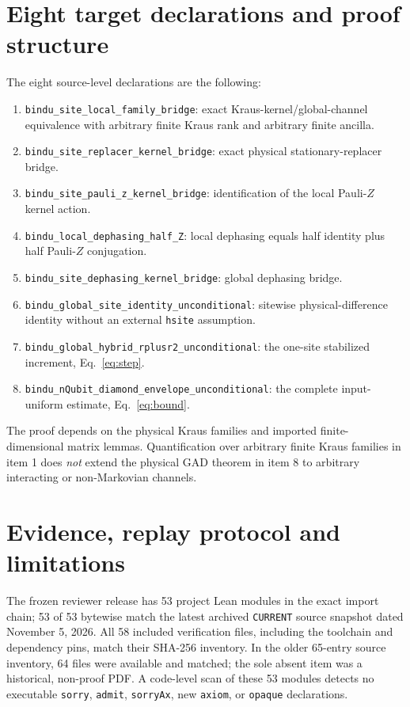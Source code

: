 \documentclass[aps,pra,reprint,superscriptaddress,amsmath,amssymb,floatfix,nofootinbib]{revtex4-2}
\begin{document}
\section{Eight target declarations and proof structure}
The eight source-level declarations are the following:
\begin{enumerate}
\item \texttt{bindu\_site\_local\_family\_bridge}: exact Kraus-kernel/global-channel equivalence with arbitrary finite Kraus rank and arbitrary finite ancilla.
\item \texttt{bindu\_site\_replacer\_kernel\_bridge}: exact physical stationary-replacer bridge.
\item \texttt{bindu\_site\_pauli\_z\_kernel\_bridge}: identification of the local Pauli-$Z$ kernel action.
\item \texttt{bindu\_local\_dephasing\_half\_Z}: local dephasing equals half identity plus half Pauli-$Z$ conjugation.
\item \texttt{bindu\_site\_dephasing\_kernel\_bridge}: global dephasing bridge.
\item \texttt{bindu\_global\_site\_identity\_unconditional}: sitewise physical-difference identity without an external \texttt{hsite} assumption.
\item \texttt{bindu\_global\_hybrid\_rplusr2\_unconditional}: the one-site stabilized increment, Eq.~\eqref{eq:step}.
\item \texttt{bindu\_nQubit\_diamond\_envelope\_unconditional}: the complete input-uniform estimate, Eq.~\eqref{eq:bound}.
\end{enumerate}
The proof depends on the physical Kraus families and imported finite-dimensional matrix lemmas. Quantification over arbitrary finite Kraus families in item 1 does \emph{not} extend the physical GAD theorem in item 8 to arbitrary interacting or non-Markovian channels.

\section{Evidence, replay protocol and limitations}
The frozen reviewer release has 53 project Lean modules in the exact import chain; 53 of 53 bytewise match the latest archived \texttt{CURRENT} source snapshot dated November 5, 2026. All 58 included verification files, including the toolchain and dependency pins, match their SHA-256 inventory. In the older 65-entry source inventory, 64 files were available and matched; the sole absent item was a historical, non-proof PDF. A code-level scan of these 53 modules detects no executable \texttt{sorry}, \texttt{admit}, \texttt{sorryAx}, new \texttt{axiom}, or \texttt{opaque} declarations.
\end{document}
